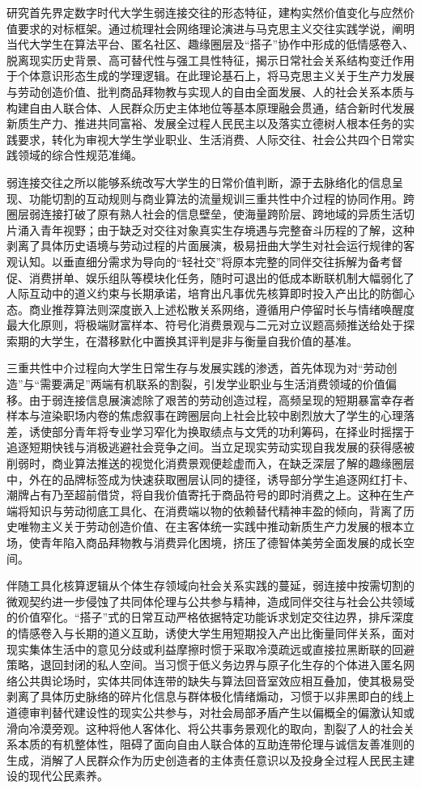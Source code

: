 研究首先界定数字时代大学生弱连接交往的形态特征，建构实然价值变化与应然价值要求的对标框架。通过梳理社会网络理论演进与马克思主义交往实践学说，阐明当代大学生在算法平台、匿名社区、趣缘圈层及“搭子”协作中形成的低情感卷入、脱离现实历史背景、高可替代性与强工具性特征，揭示日常社会关系结构变迁作用于个体意识形态生成的学理逻辑。在此理论基石上，将马克思主义关于生产力发展与劳动创造价值、批判商品拜物教与实现人的自由全面发展、人的社会关系本质与构建自由人联合体、人民群众历史主体地位等基本原理融会贯通，结合新时代发展新质生产力、推进共同富裕、发展全过程人民民主以及落实立德树人根本任务的实践要求，转化为审视大学生学业职业、生活消费、人际交往、社会公共四个日常实践领域的综合性规范准绳。

弱连接交往之所以能够系统改写大学生的日常价值判断，源于去脉络化的信息呈现、功能切割的互动规则与商业算法的流量规训三重共性中介过程的协同作用。跨圈层弱连接打破了原有熟人社会的信息壁垒，使海量跨阶层、跨地域的异质生活切片涌入青年视野；由于缺乏对交往对象真实生存境遇与完整奋斗历程的了解，这种剥离了具体历史语境与劳动过程的片面展演，极易扭曲大学生对社会运行规律的客观认知。以垂直细分需求为导向的“轻社交”将原本完整的同伴交往拆解为备考督促、消费拼单、娱乐组队等模块化任务，随时可退出的低成本断联机制大幅弱化了人际互动中的道义约束与长期承诺，培育出凡事优先核算即时投入产出比的防御心态。商业推荐算法则深度嵌入上述松散关系网络，遵循用户停留时长与情绪唤醒度最大化原则，将极端财富样本、符号化消费景观与二元对立议题高频推送给处于探索期的大学生，在潜移默化中置换其评判是非与衡量自我价值的基准。

三重共性中介过程向大学生日常生存与发展实践的渗透，首先体现为对“劳动创造”与“需要满足”两端有机联系的割裂，引发学业职业与生活消费领域的价值偏移。由于弱连接信息展演滤除了艰苦的劳动创造过程，高频呈现的短期暴富幸存者样本与渲染职场内卷的焦虑叙事在跨圈层向上社会比较中剧烈放大了学生的心理落差，诱使部分青年将专业学习窄化为换取绩点与文凭的功利筹码，在择业时摇摆于追逐短期快钱与消极逃避社会竞争之间。当立足现实劳动实现自我发展的获得感被削弱时，商业算法推送的视觉化消费景观便趁虚而入，在缺乏深层了解的趣缘圈层中，外在的品牌标签成为快速获取圈层认同的捷径，诱导部分学生追逐网红打卡、潮牌占有乃至超前借贷，将自我价值寄托于商品符号的即时消费之上。这种在生产端将知识与劳动彻底工具化、在消费端以物的依赖替代精神丰盈的倾向，背离了历史唯物主义关于劳动创造价值、在主客体统一实践中推动新质生产力发展的根本立场，使青年陷入商品拜物教与消费异化困境，挤压了德智体美劳全面发展的成长空间。

伴随工具化核算逻辑从个体生存领域向社会关系实践的蔓延，弱连接中按需切割的微观契约进一步侵蚀了共同体伦理与公共参与精神，造成同伴交往与社会公共领域的价值窄化。“搭子”式的日常互动严格依据特定功能诉求划定交往边界，排斥深度的情感卷入与长期的道义互助，诱使大学生用短期投入产出比衡量同伴关系，面对现实集体生活中的意见分歧或利益摩擦时惯于采取冷漠疏远或直接拉黑断联的回避策略，退回封闭的私人空间。当习惯于低义务边界与原子化生存的个体进入匿名网络公共舆论场时，实体共同体连带的缺失与算法回音室效应相互叠加，使其极易受剥离了具体历史脉络的碎片化信息与群体极化情绪煽动，习惯于以非黑即白的线上道德审判替代建设性的现实公共参与，对社会局部矛盾产生以偏概全的偏激认知或滑向冷漠旁观。这种将他人客体化、将公共事务景观化的取向，割裂了人的社会关系本质的有机整体性，阻碍了面向自由人联合体的互助连带伦理与诚信友善准则的生成，消解了人民群众作为历史创造者的主体责任意识以及投身全过程人民民主建设的现代公民素养。

